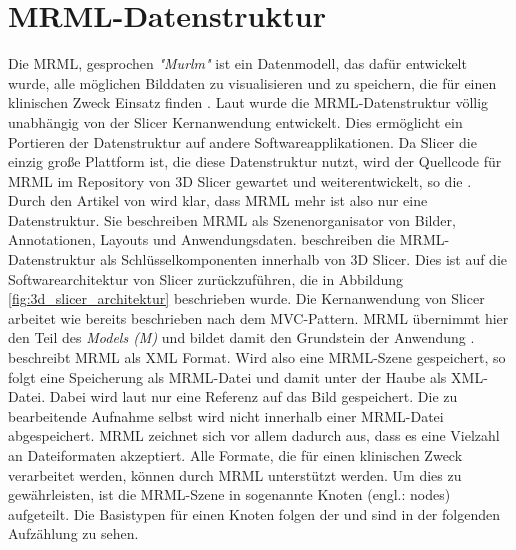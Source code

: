 \section{MRML-Datenstruktur}
\label{subsec:mrml_datenstruktur} Die \ac{MRML}, gesprochen \textit{"Murlm"} ist
ein Datenmodell, das dafür entwickelt wurde, alle möglichen Bilddaten zu
visualisieren und zu speichern, die für einen klinischen Zweck Einsatz finden \citep[vgl.][]{slicer2024}.
Laut \citet{slicer2024} wurde die \ac{MRML}-Datenstruktur völlig unabhängig von der
Slicer Kernanwendung entwickelt. Dies ermöglicht ein Portieren der Datenstruktur
auf andere Softwareapplikationen. Da Slicer die einzig große Plattform ist, die
diese Datenstruktur nutzt, wird der Quellcode für \ac{MRML} im Repository von 3D
Slicer gewartet und weiterentwickelt, so die \citet{slicer2024}. Durch den Artikel
von \citet[S.~1331]{fedorov2012slicer} wird klar, dass \ac{MRML} mehr ist also
nur eine Datenstruktur. Sie beschreiben \ac{MRML} als Szenenorganisator von
Bilder, Annotationen, Layouts und Anwendungsdaten. \citet[S.~1327]{fedorov2012slicer}
beschreiben die \ac{MRML}-Datenstruktur als Schlüsselkomponenten innerhalb von 3D
Slicer. Dies ist auf die Softwarearchitektur von Slicer zurückzuführen, die in Abbildung
\ref{fig:3d_slicer_architektur} beschrieben wurde. Die Kernanwendung von Slicer
arbeitet wie bereits beschrieben nach dem \ac{MVC}-Pattern. \ac{MRML} übernimmt hier
den Teil des \textit{Models (M)} und bildet damit den Grundstein der Anwendung
\citep[vgl.][S.~1332]{fedorov2012slicer}. \citet{slicer2024} beschreibt \ac{MRML}
als \ac{XML} Format. Wird also eine \ac{MRML}-Szene gespeichert, so folgt eine
Speicherung als \ac{MRML}-Datei und damit unter der Haube als \ac{XML}-Datei. Dabei
wird laut \citet{slicer2024} nur eine Referenz auf das Bild gespeichert. Die zu bearbeitende
Aufnahme selbst wird nicht innerhalb einer \ac{MRML}-Datei abgespeichert. \ac{MRML}
zeichnet sich vor allem dadurch aus, dass es eine Vielzahl an Dateiformaten akzeptiert.
Alle Formate, die für einen klinischen Zweck verarbeitet werden, können durch
\ac{MRML} unterstützt werden. Um dies zu gewährleisten, ist die \ac{MRML}-Szene
in sogenannte Knoten (engl.: nodes) aufgeteilt. Die Basistypen für einen Knoten folgen
der \citet{slicer2024} und sind in der folgenden Aufzählung zu sehen.


